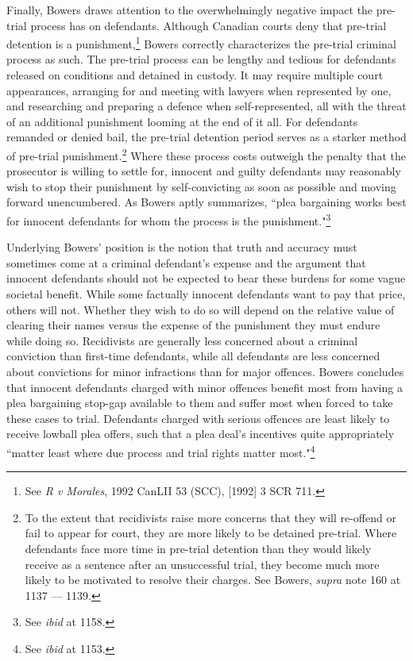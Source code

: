 Finally, Bowers draws attention to the overwhelmingly negative impact the pre-trial process has on defendants. Although Canadian courts deny that pre-trial detention is a punishment,\footnote{See \textit{R v Morales}, 1992 CanLII 53 (SCC), [1992] 3 SCR 711.} Bowers correctly characterizes the pre-trial criminal process as such. The pre-trial process can be lengthy and tedious for defendants released on conditions and detained in custody. It may require multiple court appearances, arranging for and meeting with lawyers when represented by one, and researching and preparing a defence when self-represented, all with the threat of an additional punishment looming at the end of it all. For defendants remanded or denied bail, the pre-trial detention period serves as a starker method of pre-trial punishment.\footnote{To the extent that recidivists raise more concerns that they will re-offend or fail to appear for court, they are more likely to be detained pre-trial. Where defendants face more time in pre-trial detention than they would likely receive as a sentence after an unsuccessful trial, they become much more likely to be motivated to resolve their charges. See Bowers, \textit{supra} note 160 at 1137 — 1139.} Where these process costs outweigh the penalty that the prosecutor is willing to settle for, innocent and guilty defendants may reasonably wish to stop their punishment by self-convicting as soon as possible and moving forward unencumbered. As Bowers aptly summarizes, ``plea bargaining works best for innocent defendants for whom the process is the punishment."\footnote{See \textit{ibid} at 1158.}

Underlying Bowers' position is the notion that truth and accuracy must sometimes come at a criminal defendant's expense and the argument that innocent defendants should not be expected to bear these burdens for some vague societal benefit. While some factually innocent defendants want to pay that price, others will not. Whether they wish to do so will depend on the relative value of clearing their names versus the expense of the punishment they must endure while doing so. Recidivists are generally less concerned about a criminal conviction than first-time defendants, while all defendants are less concerned about convictions for minor infractions than for major offences. Bowers concludes that innocent defendants charged with minor offences benefit most from having a plea bargaining stop-gap available to them and suffer most when forced to take these cases to trial. Defendants charged with serious offences are least likely to receive lowball plea offers, such that a plea deal's incentives quite appropriately ``matter least where due process and trial rights matter most."\footnote{See \textit{ibid} at 1153.} 

